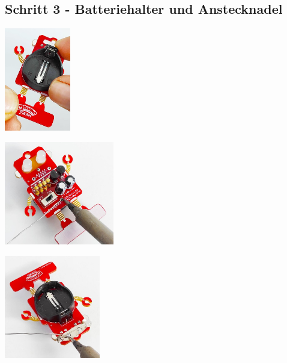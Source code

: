 \documentclass[a4paper]{article}
\begin{document}
\subsection{Schritt 3 - Batteriehalter und Anstecknadel}
\begin{minipage}[t]{0.33\textwidth}
  \centering
  \includegraphics[height=4.5cm]{../pictures/Battery.jpg}
  \label{img:Halter}
  \end{minipage}
\begin{minipage}[t]{0.33\textwidth}
  \centering
  \includegraphics[height=4.5cm]{../pictures/Loeten2.jpg}
  \label{img:Loeten2}
\end{minipage}
\begin{minipage}[t]{0.33\textwidth}
  \centering
  \includegraphics[height=4.5cm]{../pictures/Halter.jpg}
  \label{img:Loeten2}
\end{minipage}
\end{document}

